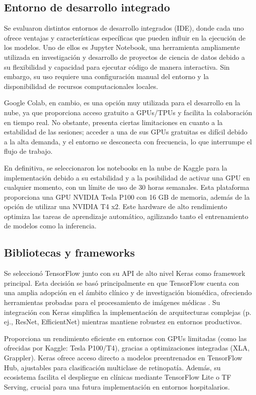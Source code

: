 \subsection{Entorno de desarrollo integrado}

Se evaluaron distintos entornos de desarrollo integrados (IDE), donde cada uno ofrece 
ventajas y características específicas que pueden influir en la ejecución de los modelos. 
Uno de ellos es Jupyter Notebook, una herramienta ampliamente utilizada en investigación 
y desarrollo de proyectos de ciencia de datos debido a su flexibilidad y capacidad para 
ejecutar código de manera interactiva. Sin embargo, su uso requiere una configuración 
manual del entorno y la disponibilidad de recursos computacionales locales.

Google Colab, en cambio, es una opción muy utilizada para el desarrollo en la nube, ya 
que proporciona acceso gratuito a GPUs/TPUs y facilita la colaboración en tiempo real. No 
obstante, presenta ciertas limitaciones en cuanto a la estabilidad de las sesiones; 
acceder a una de sus GPUs gratuitas es difícil debido a la alta demanda, y el entorno se 
desconecta con frecuencia, lo que interrumpe el flujo de trabajo.

En definitiva, se seleccionaron los notebooks en la nube de Kaggle para la implementación 
debido a su estabilidad y a la posibilidad de activar una GPU en cualquier momento, con 
un límite de uso de 30 horas semanales. Esta plataforma proporciona una GPU NVIDIA Tesla 
P100 con 16 GB de memoria, además de la opción de utilizar una NVIDIA T4 x2. Este 
hardware de alto rendimiento optimiza las tareas de aprendizaje automático, agilizando 
tanto el entrenamiento de modelos como la inferencia.

\subsection{Bibliotecas y frameworks}

Se seleccionó TensorFlow junto con su API de alto nivel Keras como framework principal. 
Esta decisión se basó principalmente en que TensorFlow cuenta con una amplia adopción en 
el ámbito clínico y de investigación biomédica, ofreciendo herramientas probadas para el 
procesamiento de imágenes médicas . Su integración con 
Keras simplifica la implementación de arquitecturas complejas (p. ej., ResNet, 
EfficientNet) mientras mantiene robustez en entornos productivos.

Proporciona un rendimiento eficiente en entornos con GPUs limitadas (como las ofrecidas 
por Kaggle: Tesla P100/T4), gracias a optimizaciones integradas (XLA, Grappler). Keras 
ofrece acceso directo a modelos preentrenados en TensorFlow Hub, ajustables para 
clasificación multiclase de retinopatía. Además, su ecosistema facilita el despliegue en 
clínicas mediante TensorFlow Lite o TF Serving, crucial para una futura implementación en 
entornos hospitalarios.


